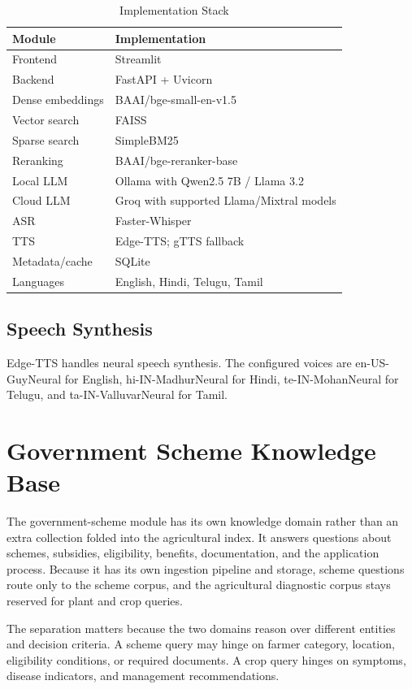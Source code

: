 \documentclass[10pt,twocolumn,letterpaper]{article}
\begin{document}
\begin{table}[t]
\caption{Implementation Stack}
\label{tab:stack}
\centering
\footnotesize
\begin{tabular}{@{}p{2.3cm}p{5.0cm}@{}}
\toprule
\textbf{Module} & \textbf{Implementation} \\
\midrule
Frontend & Streamlit \\
Backend & FastAPI + Uvicorn \\
Dense embeddings & BAAI/bge-small-en-v1.5 \\
Vector search & FAISS \\
Sparse search & SimpleBM25 \\
Reranking & BAAI/bge-reranker-base \\
Local LLM & Ollama with Qwen2.5 7B / Llama 3.2 \\
Cloud LLM & Groq with supported Llama/Mixtral models \\
ASR & Faster-Whisper \\
TTS & Edge-TTS; gTTS fallback \\
Metadata/cache & SQLite \\
Languages & English, Hindi, Telugu, Tamil \\
\bottomrule
\end{tabular}
\end{table}

\subsection{Speech Synthesis}
Edge-TTS handles neural speech synthesis. The configured voices are en-US-GuyNeural for English, hi-IN-MadhurNeural for Hindi, te-IN-MohanNeural for Telugu, and ta-IN-ValluvarNeural for Tamil.

\section{Government Scheme Knowledge Base}
The government-scheme module has its own knowledge domain rather than an extra collection folded into the agricultural index. It answers questions about schemes, subsidies, eligibility, benefits, documentation, and the application process. Because it has its own ingestion pipeline and storage, scheme questions route only to the scheme corpus, and the agricultural diagnostic corpus stays reserved for plant and crop queries.

The separation matters because the two domains reason over different entities and decision criteria. A scheme query may hinge on farmer category, location, eligibility conditions, or required documents. A crop query hinges on symptoms, disease indicators, and management recommendations.
\end{document}
